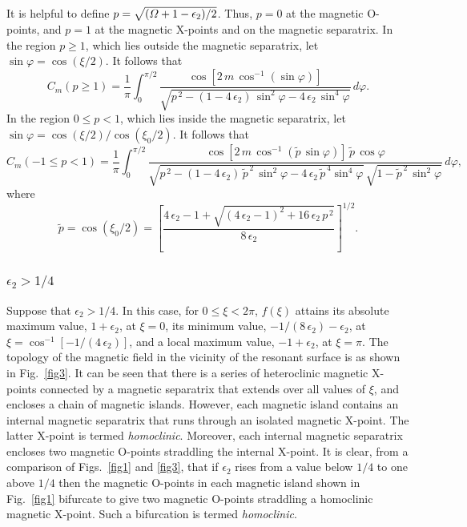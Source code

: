 \documentclass[12pt,prb,aps]{revtex4-1}
\begin{document}
It is helpful to define $p=\sqrt{({\mit\Omega}+1-\epsilon_2)/2}$.  Thus, $p=0$ at the magnetic O-points, and $p=1$ at the
magnetic X-points and on the magnetic separatrix. In the region $p\geq1$, which lies outside the magnetic separatrix, let $\sin\varphi = \cos(\xi/2)$. 
It follows that 
\begin{equation}
 C_m(p\geq 1)=\frac{1}{\pi} \int_{0}^{\pi/2}\frac{\cos[2\,m\,\cos^{-1}(\sin\varphi)]}
 {\sqrt{p^{\,2}-(1-4\,\epsilon_2)\,\sin^2\varphi-4\,\epsilon_2\,\sin^4\varphi}}\,d\varphi.
\end{equation}
In the region $0\leq p< 1$, which lies inside the magnetic separatrix, let 
$\sin\varphi = \cos(\xi/2)/\cos(\xi_0/2)$.
 It follows that 
\begin{equation}
 C_m(-1\leq p< 1)=\frac{1}{\pi} \int_{0}^{\pi/2}\frac{\cos[2\,m\,\cos^{-1}(\tilde{p}\,\sin\varphi)]\,\tilde{p}\,\cos\varphi}
 {\sqrt{p^{\,2}-(1-4\,\epsilon_2)\,\tilde{p}^{\,2}\,\sin^2\varphi-4\,\epsilon_2\,\tilde{p}^{\,4}\sin^4\varphi}\,\sqrt{1-\tilde{p}^{\,2}\,\sin^2\varphi}}\,d\varphi,
\end{equation}
where
\begin{equation}\label{tildep}
\tilde{p}= \cos(\xi_0/2) = \left[\frac{4\,\epsilon_2-1+\sqrt{(4\,\epsilon_2-1)^2+16\,\epsilon_2\,p^{\,2}}}{8\,\epsilon_2}\right]^{1/2}.
\end{equation}


\subsubsection{$\epsilon_2 > 1/4$}
Suppose that $\epsilon_2> 1/4$. In this case, for $0\leq \xi< 2\pi$, $f(\xi)$ attains its absolute maximum value, $1+\epsilon_2$, at $\xi=0$, its minimum value, $-1/(8\,\epsilon_2)-\epsilon_2$, at $\xi=\cos^{-1}[-1/(4\,\epsilon_2)]$,
and a local maximum value, $-1+\epsilon_2$, at $\xi=\pi$.    The topology of the magnetic field 
in the vicinity of the resonant surface is as shown in Fig.~\ref{fig3}. It can be seen that there is  a series of heteroclinic magnetic X-points connected by a
magnetic separatrix that extends over all values of $\xi$, and encloses a chain of magnetic islands. However,
each magnetic island contains an internal magnetic separatrix that runs through an isolated magnetic
X-point. The latter X-point is termed {\em homoclinic}. Moreover, each internal magnetic separatrix encloses two magnetic O-points straddling the
internal X-point. It is clear, from a comparison of Figs.~\ref{fig1} and \ref{fig3}, that if $\epsilon_2$ rises from a value below $1/4$ to one above $1/4$ then the magnetic O-points
in each magnetic island shown in Fig.~\ref{fig1} bifurcate to give two magnetic O-points straddling  a homoclinic magnetic X-point. Such a bifurcation
is termed {\em homoclinic}. 
\end{document}
